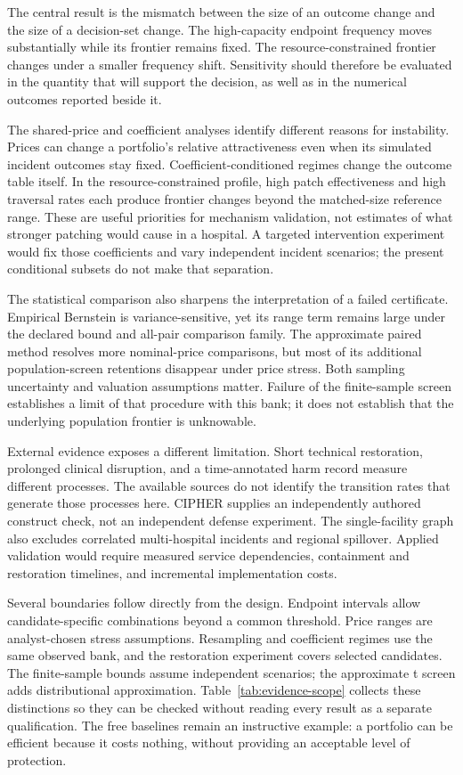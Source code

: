 The central result is the mismatch between the size of an outcome change
and the size of a decision-set change. The high-capacity endpoint frequency
moves substantially while its frontier remains fixed. The resource-constrained
frontier changes under a smaller frequency shift. Sensitivity should therefore
be evaluated in the quantity that will support the decision, as well as in
the numerical outcomes reported beside it.

The shared-price and coefficient analyses identify different reasons for
instability. Prices can change a portfolio's relative attractiveness even
when its simulated incident outcomes stay fixed. Coefficient-conditioned
regimes change the outcome table itself. In the resource-constrained profile,
high patch effectiveness and high traversal rates each produce frontier
changes beyond the matched-size reference range. These are useful priorities
for mechanism validation, not estimates of what stronger patching would cause
in a hospital. A targeted intervention experiment would fix those coefficients
and vary independent incident scenarios; the present conditional subsets do
not make that separation.

The statistical comparison also sharpens the interpretation of a failed
certificate. Empirical Bernstein is variance-sensitive, yet its range term
remains large under the declared bound and all-pair comparison family. The
approximate paired method resolves more nominal-price comparisons, but most
of its additional population-screen retentions disappear under price stress.
Both sampling uncertainty and valuation assumptions matter. Failure of the
finite-sample screen establishes a limit of that procedure with this bank;
it does not establish that the underlying population frontier is unknowable.

External evidence exposes a different limitation. Short technical restoration,
prolonged clinical disruption, and a time-annotated harm record measure different
processes. The available sources do not identify the transition rates that
generate those processes here. CIPHER supplies an independently authored
construct check, not an independent defense experiment. The single-facility
graph also excludes correlated multi-hospital incidents and regional spillover.
Applied validation would require measured service dependencies, containment
and restoration timelines, and incremental implementation costs.

Several boundaries follow directly from the design. Endpoint intervals allow
candidate-specific combinations beyond a common threshold. Price ranges are
analyst-chosen stress assumptions. Resampling and coefficient regimes use the
same observed bank, and the restoration experiment covers selected candidates.
The finite-sample bounds assume independent scenarios; the approximate t
screen adds distributional approximation. Table~\ref{tab:evidence-scope}
collects these distinctions so they can be checked without reading every
result as a separate qualification. The free baselines remain an instructive
example: a portfolio can be efficient because it costs nothing, without
providing an acceptable level of protection.

